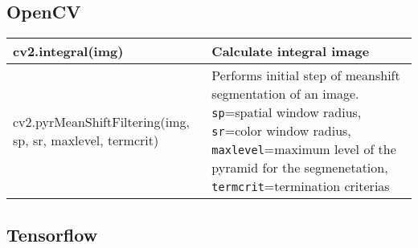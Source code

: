 \subsection{OpenCV}
\begin{tabularx}{\textwidth}{t{6cm} X}
    \hline
    cv2.integral(img)                                          & Calculate integral image                                                                                                                                                                                                                       \\\hline
    cv2.pyrMeanShiftFiltering(img, sp, sr, maxlevel, termcrit) & Performs initial step of meanshift segmentation of an image. \texttt{sp}=spatial window radius, \texttt{sr}=color window radius, \texttt{maxlevel}=maximum level of the pyramid for the segmenetation, \texttt{termcrit}=termination criterias \\\hline
\end{tabularx}

\subsection{Tensorflow}

